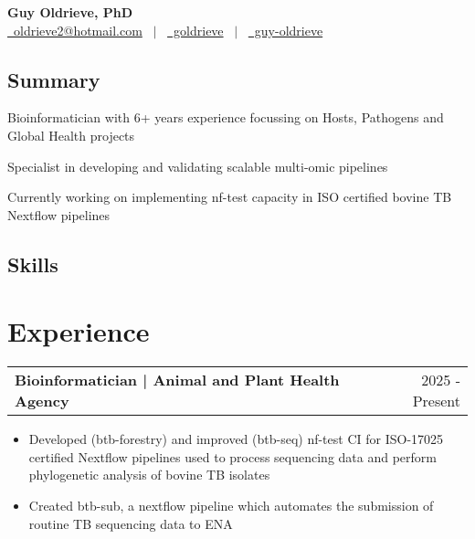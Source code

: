 \documentclass[a4paper,11pt]{article}
\makeatletter
\newenvironment{joblong}[2]{
  \begin{tabularx}{\linewidth}{@{}l X r@{}}
  \textbf{#1} & & #2 \\[2pt]
  \end{tabularx}
  \begin{itemize}[leftmargin=1.2em, itemsep=3pt, label=-]
}{
  \end{itemize}
}
\makeatother
\begin{document}
\pagestyle{empty}


\begin{center}
    {\Huge \textbf{Guy Oldrieve, PhD}} \\[6pt]
    \href{mailto:oldrieve2@hotmail.com}{\faEnvelope\ oldrieve2@hotmail.com}  \ $|$ \ 
    \href{https://github.com/goldrieve}{\faGithub\ goldrieve}  \ $|$ \ 
    \href{https://linkedin.com/in/guy-oldrieve}{\faLinkedin\ guy-oldrieve}
    \end{center}

\begin{multicols}{2}
\subsection*{Summary}
\item Bioinformatician with 6+ years experience focussing on Hosts, Pathogens and Global Health projects
\item Specialist in developing and validating scalable multi-omic pipelines
\item Currently working on implementing nf-test capacity in ISO certified bovine TB Nextflow pipelines

\columnbreak

\subsection*{Skills}
\item {}   
\item {}   
\item \skillbox{AWS/HPC} \skillbox{GH Actions}
\end{multicols}

\section{Experience}

\begin{joblong}{Bioinformatician | Animal and Plant Health Agency}{2025 - Present}
\item Developed (btb-forestry) and improved (btb-seq) nf-test CI for ISO-17025 certified Nextflow pipelines used to process sequencing data and perform phylogenetic analysis of bovine TB isolates
\item Created btb-sub, a nextflow pipeline which automates the submission of routine TB sequencing data to ENA
\end{joblong}
\end{document}
